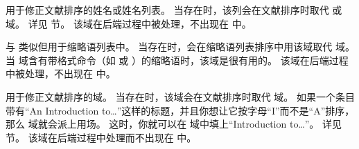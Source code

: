 \begin{fieldlist}



用于修正文献排序的姓名或姓名列表。
当存在时，该列会在文献排序时取代   或  域。
详见  节。
该域在后端过程中被处理，不出现在  中。




与  类似但用于缩略语列表中。
当存在时，\biblatex 会在缩略语列表排序中用该域取代  域。
当  域含有带格式命令（如  或 ）的缩略语时，该域是很有用的。
该域在后端过程中被处理，不出现在  中。




用于修正文献排序的域。
当存在时，该域会在文献排序时取代  域。
如果一个条目带有“An Introduction to\dots”这样的标题，并且你想让它按字母“I”而不是“A”排序，那么  域就会派上用场。
这时，你就可以在  域中填上“Introduction to\dots”。
详见  节。
该域在后端过程中处理而不出现在  中。


\end{fieldlist}
